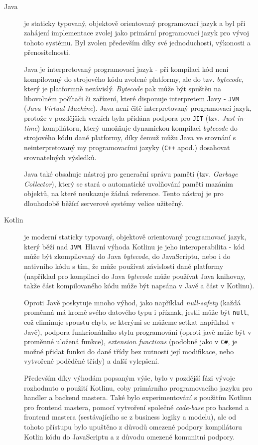 \begin{description}
    \item[Java] je staticky typovaný, objektově orientovaný programovací jazyk a byl při zahájení implementace zvolej jako primární programovací jazyk pro vývoj tohoto systému. Byl zvolen především díky své jednoduchosti, výkonosti a přenositelnosti. 
    
    Java je interpretovaný programovací jazyk - při kompilaci kód není kompilovaný do strojového kódu zvolené platformy, ale do tzv. \textit{bytecode}, který je platformně nezávislý. \textit{Bytecode} pak může být spuštěn na libovolném počítači či zařízení, které disponuje interpretem Javy - \texttt{JVM} (\textit{Java Virtual Machine}). Java není čitě interpretovaný programovací jazyk, protože v pozdějších verzích byla přidána podpora pro \texttt{JIT} (tzv. \textit{Just-in-time}) kompilátoru, který umožňuje dynamickou kompilaci \textit{bytecode} do strojového kódu dané platformy, díky čemuž můžu Java ve srovnání s neinterpretovaný
    my programovacími jazyky (\texttt{C++} apod.) dosahovat srovnatelných výsledků.
    
    Java také obsahuje nástroj pro generační správu paměti (tzv. \textit{Garbage Collector}), který se stará o automatické uvolňování paměti mazáním objektů, na které neukazuje žádná reference. Tento nástroj je pro dlouhodobě běžící serverové systémy velice užitečný.

    \item[Kotlin] je moderní staticky typovaný, objektově orientovaný programovací jazyk, který běží nad \texttt{JVM}. Hlavní výhoda Kotlinu je jeho interoperabilita - kód může být zkompilovaný do Java \textit{bytecode}, do JavaScriptu, nebo i do nativního kódu s tím, že může používat závislosti dané platformy (například pro kompilaci do Java \textit{bytecode} může používat Java knihovny, takže část kompilovaného kódu může být napsána v Javě a část v Kotlinu).

    Oproti Javě poskytuje mnoho výhod, jako například \textit{null-safety} (každá proměnná má kromě svého datového typu i příznak, jestli může být \texttt{null}, což eliminuje spoustu chyb, se kterými se můžeme setkat například v Javě), podpora funkcionálního stylu programování (oproti javě může být v proměnné uložená funkce), \textit{extension functions} (podobně jako v \texttt{C\#}, je možné přidat funkci do dané třídy bez nutnosti její modifikace, nebo vytvořené poděděné třídy) a další vylepšení. 
    
    Především díky výhodám popsaným výše, bylo v pozdější fázi vývoje rozhodnuto o použití Kotlinu, coby primárního programovacího jazyku pro handler a backend mastera. Také bylo experimentování s použitím Kotlinu pro frontend mastera, pomocí vytvoření společné \textit{code-base} pro backend a frontend mastera (sestávajícího se z business logiky a modelu), ale od tohoto přístupu bylo upuštěno z důvodů omezené podpory kompilátoru Kotlin kódu do JavaScriptu a z důvodu omezené komunitní podpory.
    

\end{description}

